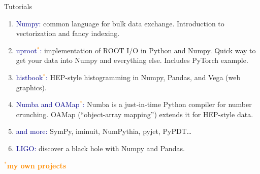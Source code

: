 \documentclass[aspectratio=169]{beamer}
\begin{document}
\begin{frame}{Tutorials}
\vspace{0.25 cm}
\begin{enumerate}\setlength{\itemsep}{0.25 cm}
\item \textcolor{darkblue}{Numpy:} common language for bulk data exchange. Introduction to vectorization and fancy indexing.

\item \textcolor{darkblue}{uproot\textcolor{darkorange}{\bf\small$^\text{*}$}:} implementation of ROOT I/O in Python and Numpy. Quick way to get your data into Numpy and everything else. Includes PyTorch example.

\item \textcolor{darkblue}{histbook\textcolor{darkorange}{\bf\small$^\text{*}$}:} HEP-style histogramming in Numpy, Pandas, and Vega (web graphics).

\item \textcolor{darkblue}{Numba and OAMap\textcolor{darkorange}{\bf\small$^\text{*}$}:} Numba is a just-in-time Python compiler for number crunching. OAMap (``object-array mapping'') extends it for HEP-style data.

\item \textcolor{darkblue}{and more:} SymPy, iminuit, NumPythia, pyjet, PyPDT\ldots

\item \textcolor{darkblue}{LIGO:} discover a black hole with Numpy and Pandas.
\end{enumerate}

\vspace{0.25 cm}
\textcolor{darkorange}{\small\bf$^\text{*}$my own projects}
\end{frame}





\end{document}

